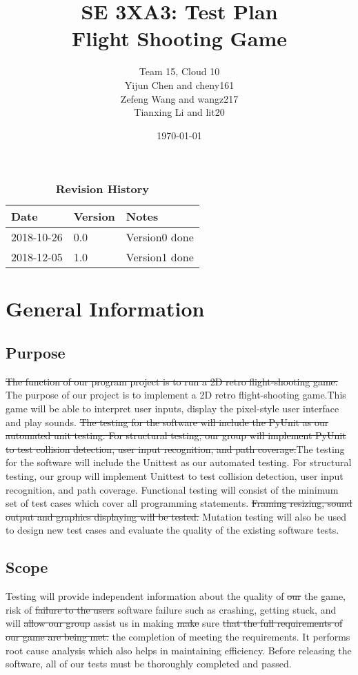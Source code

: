 \documentclass[12pt, titlepage]{article}
\title{SE 3XA3: Test Plan\\Flight Shooting Game}
\author{Team 15, Cloud 10
		\\ Yijun Chen and cheny161
		\\ Zefeng Wang and wangz217
		\\ Tianxing Li and lit20
}
\date{\today}
\begin{document}
\maketitle

\tableofcontents
\listoftables
\listoffigures

\begin{table}[bp]
\caption{\bf Revision History}
\begin{tabularx}{\textwidth}{p{3cm}p{2cm}X}
\toprule {\bf Date} & {\bf Version} & {\bf Notes}\\
\midrule
2018-10-26 & 0.0 & Version0 done\\
2018-12-05 & 1.0 & Version1 done\\

\bottomrule
\end{tabularx}
\end{table}

\newpage



\section{General Information}

\subsection{Purpose}
\sout{The function of our program project is to run a 2D retro flight-shooting game.} {\color{red}The purpose of our project is to implement a 2D retro flight-shooting game.}This game will be able to interpret user inputs, display the pixel-style user interface and play sounds. \sout{The testing for the software will include the PyUnit as our automated unit testing. For structural testing, our group will implement PyUnit to test collision detection, user input recognition, and path coverage.}{\color{red}The testing for the software will include the Unittest as our automated testing. For structural testing, our group will implement Unittest to test collision detection, user input recognition, and path coverage.} Functional testing will consist of the minimum set of test cases which cover all programming statements.  \sout{Framing resizing, sound output and graphics displaying will be tested.} Mutation testing will also be used to design new test cases and evaluate the quality of the existing software tests.
\\
\subsection{Scope}
Testing will provide independent information about the quality of \sout{our} {\color{red} the} game, risk of \sout{failure to the users} {\color{red} software failure such as crashing, getting stuck}, and will \sout{allow our group} {\color{red}assist us in making} \sout{make} sure \sout{that the full requirements of our game are being met.} {\color{red} the completion of meeting the requirements.} It performs root cause analysis which also helps in maintaining efficiency. Before releasing the software, all of our tests must be thoroughly completed and passed.
\newpage
\end{document}
